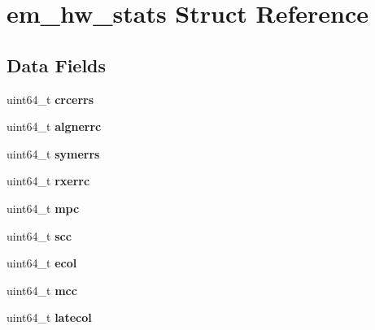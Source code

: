 \hypertarget{structem__hw__stats}{}\section{em\+\_\+hw\+\_\+stats Struct Reference}
\label{structem__hw__stats}
\subsection*{Data Fields}
\begin{DoxyCompactItemize}
\item 
\mbox{\label{structem__hw__stats_afbcf415f8c64253fa406d8875172d9be}} 
uint64\+\_\+t {\bfseries crcerrs}
\item 
\mbox{\label{structem__hw__stats_a48150a865b5b6540d0f42f6b3582532e}} 
uint64\+\_\+t {\bfseries algnerrc}
\item 
\mbox{\label{structem__hw__stats_a375bb4961176bf66b4147f9e407d26e4}} 
uint64\+\_\+t {\bfseries symerrs}
\item 
\mbox{\label{structem__hw__stats_a1dd4aae53700e0e70a7f5d00013329f3}} 
uint64\+\_\+t {\bfseries rxerrc}
\item 
\mbox{\label{structem__hw__stats_a6007396d5415e1081b8770547010f128}} 
uint64\+\_\+t {\bfseries mpc}
\item 
\mbox{\label{structem__hw__stats_adc0967b6532f415ddee629eaa739b96c}} 
uint64\+\_\+t {\bfseries scc}
\item 
\mbox{\label{structem__hw__stats_afd1e3f9cd8a66780d5b4fbb40140c4f5}} 
uint64\+\_\+t {\bfseries ecol}
\item 
\mbox{\label{structem__hw__stats_a4aa6bf0b5ddd22d8236de821aeb23160}} 
uint64\+\_\+t {\bfseries mcc}
\item 
\mbox{\label{structem__hw__stats_a628b9f79a1c53c7494d862116544fe39}} 
uint64\+\_\+t {\bfseries latecol}
\item 
\mbox{\label{structem__hw__stats_a69161c640f2a7c37170c88c6678548ed}} 

\end{DoxyCompactItemize}
